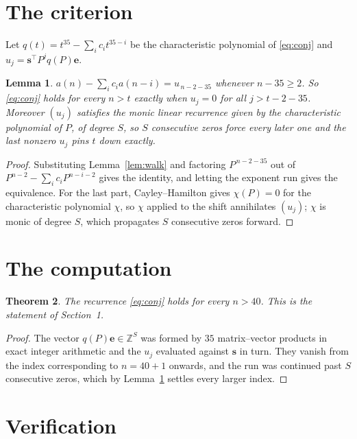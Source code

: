 \documentclass[11pt,a4paper]{article}
\theoremstyle{plain}
\newtheorem{theorem}{Theorem}
\newtheorem{lemma}[theorem]{Lemma}
\theoremstyle{definition}
\begin{document}
\section{The criterion}

Let $q(t)=t^{35}-\sum_i c_i t^{35-i}$ be the characteristic polynomial of
\eqref{eq:conj} and $u_j=\mathbf{s}^{\!\top}P^{j}q(P)\mathbf{e}$.

\begin{lemma}\label{lem:crit}
$a(n)-\sum_i c_i a(n-i)=u_{\,n-2-35}$ whenever $n-35\ge2$. So \eqref{eq:conj}
holds for every $n>t$ exactly when $u_j=0$ for all $j>t-2-35$. Moreover $(u_j)$
satisfies the monic linear recurrence given by the characteristic polynomial of $P$, of
degree $S$, so $S$ consecutive zeros force every later one and the last nonzero $u_j$ pins
$t$ down exactly.
\end{lemma}

\begin{proof}
Substituting Lemma~\ref{lem:walk} and factoring $P^{\,n-2-35}$ out of
$P^{n-2}-\sum_i c_i P^{n-i-2}$ gives the identity, and letting the exponent run gives the
equivalence. For the last part, Cayley--Hamilton gives $\chi(P)=0$ for the characteristic
polynomial $\chi$, so $\chi$ applied to the shift annihilates $(u_j)$; $\chi$ is monic of
degree $S$, which propagates $S$ consecutive zeros forward.
\end{proof}

\section{The computation}

\begin{theorem}
The recurrence \eqref{eq:conj} holds for every $n>40$. This is the statement of
Section~1.
\end{theorem}

\begin{proof}
The vector $q(P)\mathbf{e}\in\mathbb{Z}^{S}$ was formed by $35$ matrix--vector
products in exact integer arithmetic and the $u_j$ evaluated against $\mathbf{s}$ in turn.
They vanish from the index corresponding to $n=40+1$ onwards, and the run was continued
past $S$ consecutive zeros, which by Lemma~\ref{lem:crit} settles every larger index.
\end{proof}

\section{Verification}
\end{document}
